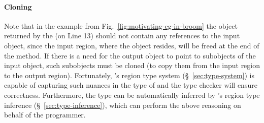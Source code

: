 



\paragraph{Cloning} Note that in the example from
Fig.~\ref{fig:motivating-eg-in-broom} the object returned by the
 (on Line 13) should not contain any references to the
input object, since the input region, where the object resides, will
be freed at the end of the method. If there is a need for the output
object to point to subobjects of the input object, such subobjects
must be cloned (to copy them from the input region to the output
region).  Fortunately, \name's region type system
(\S~\ref{sec:type-system}) is capable of capturing such nuances in the
type of  and the type checker will ensure correctness.
Furthermore, the type can be automatically inferred by \name's region
type inference (\S~\ref{sec:type-inference}), which can perform the
above reasoning on behalf of the programmer.


